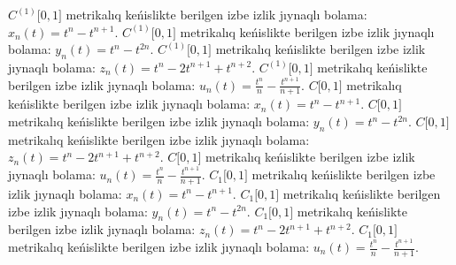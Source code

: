 \(C^{(1)}\lbrack 0,1\rbrack\) metrikalıq keńislikte berilgen izbe izlik jıynaqlı bolama: \(x_{n}(t) = t^{n} - t^{n + 1}\).
\(C^{(1)}\lbrack 0,1\rbrack\) metrikalıq keńislikte berilgen izbe izlik jıynaqlı bolama: \(y_{n}(t) = t^{n} - t^{2n}\).
\(C^{(1)}\lbrack 0,1\rbrack\) metrikalıq keńislikte berilgen izbe izlik jıynaqlı bolama: \(z_{n}(t) = t^{n} - 2t^{n + 1} + t^{n + 2}\).
\(C^{(1)}\lbrack 0,1\rbrack\) metrikalıq keńislikte berilgen izbe izlik jıynaqlı bolama: \(u_{n}(t) = \frac{t^{n}}{n} - \frac{t^{n + 1}}{n + 1}\).
\(C\lbrack 0,1\rbrack\) metrikalıq keńislikte berilgen izbe izlik jıynaqlı bolama: \(x_{n}(t) = t^{n} - t^{n + 1}\).
\(C\lbrack 0,1\rbrack\) metrikalıq keńislikte berilgen izbe izlik jıynaqlı bolama: \(y_{n}(t) = t^{n} - t^{2n}\).
\(C\lbrack 0,1\rbrack\) metrikalıq keńislikte berilgen izbe izlik jıynaqlı bolama: \(z_{n}(t) = t^{n} - 2t^{n + 1} + t^{n + 2}\).
\(C\lbrack 0,1\rbrack\) metrikalıq keńislikte berilgen izbe izlik jıynaqlı bolama: \(u_{n}(t) = \frac{t^{n}}{n} - \frac{t^{n + 1}}{n + 1}\).
\(C_{1}\lbrack 0,1\rbrack\) metrikalıq keńislikte berilgen izbe izlik jıynaqlı bolama: \(x_{n}(t) = t^{n} - t^{n + 1}\).
\(C_{1}\lbrack 0,1\rbrack\) metrikalıq keńislikte berilgen izbe izlik jıynaqlı bolama: \(y_{n}(t) = t^{n} - t^{2n}\).
\(C_{1}\lbrack 0,1\rbrack\) metrikalıq keńislikte berilgen izbe izlik jıynaqlı bolama: \(z_{n}(t) = t^{n} - 2t^{n + 1} + t^{n + 2}\).
\(C_{1}\lbrack 0,1\rbrack\) metrikalıq keńislikte berilgen izbe izlik jıynaqlı bolama: \(u_{n}(t) = \frac{t^{n}}{n} - \frac{t^{n + 1}}{n + 1}\).